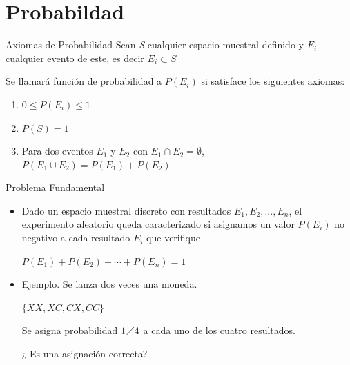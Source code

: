 \documentclass[11pt]{beamer}
\begin{document}
\section{Probabildad}

\begin{frame}{Axiomas de Probabilidad}
Sean \textit{S} cualquier espacio muestral definido y \textit{$E_{i}$} cualquier evento de este, es decir 
\textit{$E_{i} \subset S$}

	Se llamará función de probabilidad a \textit{$P(E_{i})$} si satisface los siguientes axiomas:
\begin{enumerate}

\item $0\leq P(E_{i})\leq  1$
\item $P(S)= 1$
\item Para dos eventos $E_{1}$ y $E_{2}$ con $E_{1} \cap E_{2}= \emptyset$, $P(E_{1} \cup E_{2})= P(E_{1})+ P(E_{2})$

\end{enumerate}

\end{frame}
\begin{frame}{Problema Fundamental}
\begin{itemize}
\item Dado un espacio muestral discreto con resultados $E_{1}, E_{2}, ... , E_{n}$, el experimento aleatorio queda caracterizado si asignamos un valor $P(E_{i})$ no negativo a cada resultado $E_{i}$ que verifique
\begin{center}
$P(E_{1})+ P(E_{2})+ \cdots + P(E_{n})=1$
\end{center}
\item Ejemplo. Se lanza dos veces una moneda.
\begin{center}
$\lbrace XX,XC,CX,CC \rbrace$
\end{center}


	Se asigna probabilidad $1\diagup 4$ a cada uno de los cuatro resultados.
	
¿ Es una asignación correcta?

\end{itemize}
\end{frame}
\end{document}
